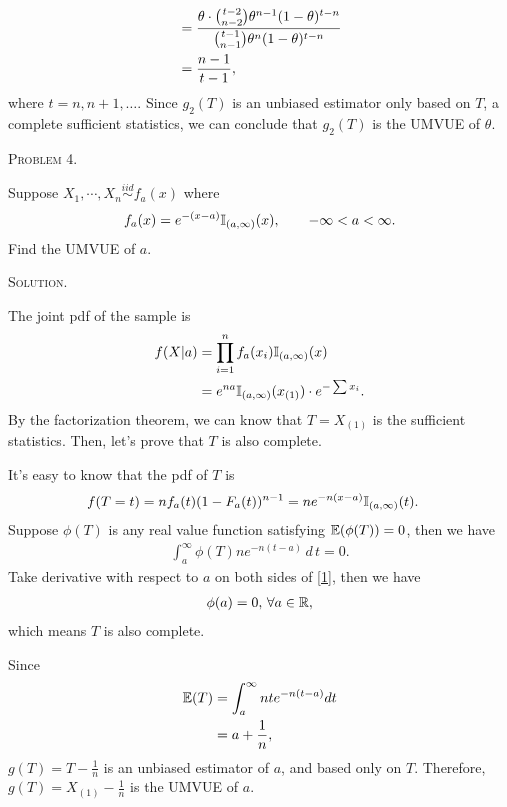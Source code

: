 \documentclass{article}
\begin{document}
\begin{CJK}{UTF8}{gbsn}
\begin{itemize}
\begin{align}
                         & = \frac{\theta \cdot \binom{t-2}{n-2}\theta^{n-1}(1-\theta)^{t-n}}{\binom{t-1}{n-1}\theta^n(1-\theta)^{t-n}} \notag \\
                         & = \frac{n-1}{t-1},\notag
              \end{align}
              where $t = n, n+1, \ldots$.
              Since $g_2(T)$ is an unbiased estimator only based on $T$, a complete sufficient statistics, we can conclude that
              $g_2(T)$ is the UMVUE of $\theta$.
    \end{itemize}





    \begin{shaded}
        \noindent\textsc{Problem 4.}\par
        Suppose $X_1, \cdots, X_n \mathop{\sim}\limits^{iid} f_a(x)$ where
        \begin{align}
            f_a(x) = e^{-(x-a)}{\mathbb I}_{(a, \infty)}(x), \qquad -\infty < a < \infty.
        \end{align}
        Find the UMVUE of $a$.
    \end{shaded}
    \noindent\textsc{Solution.}\par
    The joint pdf of the sample is
    \begin{align}
        f(X|a) & = \prod_{i=1}^n f_a(x_i) {\mathbb I}_{(a, \infty)}(x) \notag            \\
               & = e^{na} {\mathbb I}_{(a, \infty)}(x_{(1)}) \cdot e^{-\sum x_i}. \notag
    \end{align}
    By the factorization theorem, we can know that $T=X_{(1)}$ is the sufficient statistics.
    Then, let's prove that $T$ is also complete.

    It's easy to know that the pdf of $T$ is
    \begin{align}
        f(T=t) & = n f_a(t) (1-F_a(t))^{n-1} = n e^{-n(x-a)} {\mathbb I}_{(a, \infty)}(t).\notag
    \end{align}
    Suppose $\phi(T)$ is any real value function satisfying ${\mathbb E}(\phi(T))=0$, then we have
    \begin{align}
        \int_a^{\infty} \phi(T) n e^{-n(t-a)}\, d \, t = 0.\label{1}
    \end{align}
    Take derivative with respect to $a$ on both sides of \eqref{1}, then we have
    \begin{align}
        \phi(a)=0,\, \forall a \in {\mathbb R},\notag
    \end{align}
    which means $T$ is also complete.

    Since
    \begin{align}
        {\mathbb E}(T) & = \int_a^{\infty} nte^{-n(t-a)} dt \notag \\
               & = a + \frac{1}{n},\notag
    \end{align}
    $g(T) = T - \frac{1}{n}$ is an unbiased estimator of $a$, and based only on $T$.
    Therefore, $g(T)=X_{(1)}-\frac{1}{n}$ is the UMVUE of $a$.

\end{CJK}
\end{document}
